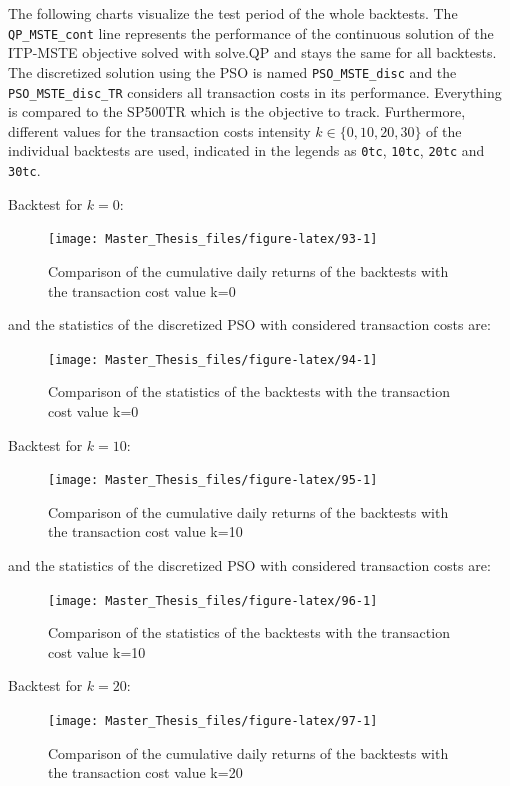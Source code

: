 \documentclass[
  oneside, a4paper, 12pt, openany]{book}
\theoremstyle{definition}
\theoremstyle{definition}
\theoremstyle{definition}
\theoremstyle{definition}
\theoremstyle{remark}
\begin{document}
The following charts visualize the test period of the whole backtests. The \texttt{QP\_MSTE\_cont} line represents the performance of the continuous solution of the ITP-MSTE objective solved with solve.QP and stays the same for all backtests. The discretized solution using the PSO is named \texttt{PSO\_MSTE\_disc} and the \texttt{PSO\_MSTE\_disc\_TR} considers all transaction costs in its performance. Everything is compared to the SP500TR which is the objective to track. Furthermore, different values for the transaction costs intensity \(k \in \{0, 10, 20, 30\}\) of the individual backtests are used, indicated in the legends as \texttt{0tc}, \texttt{10tc}, \texttt{20tc} and \texttt{30tc}.

Backtest for \(k=0\):

\begin{figure}[H]
\texttt{[image: Master\_Thesis\_files/figure-latex/93-1]} \caption{Comparison of the cumulative daily returns of the backtests with the transaction cost value k=0}\label{fig:93}
\end{figure}

and the statistics of the discretized PSO with considered transaction costs are:

\begin{figure}[H]
\texttt{[image: Master\_Thesis\_files/figure-latex/94-1]} \caption{Comparison of the statistics of the backtests with the transaction cost value k=0}\label{fig:94}
\end{figure}

Backtest for \(k=10\):

\begin{figure}[H]
\texttt{[image: Master\_Thesis\_files/figure-latex/95-1]} \caption{Comparison of the cumulative daily returns of the backtests with the transaction cost value k=10}\label{fig:95}
\end{figure}

and the statistics of the discretized PSO with considered transaction costs are:

\begin{figure}[H]
\texttt{[image: Master\_Thesis\_files/figure-latex/96-1]} \caption{Comparison of the statistics of the backtests with the transaction cost value k=10}\label{fig:96}
\end{figure}

Backtest for \(k=20\):

\begin{figure}[H]
\texttt{[image: Master\_Thesis\_files/figure-latex/97-1]} \caption{Comparison of the cumulative daily returns of the backtests with the transaction cost value k=20}\label{fig:97}
\end{figure}
\end{document}
